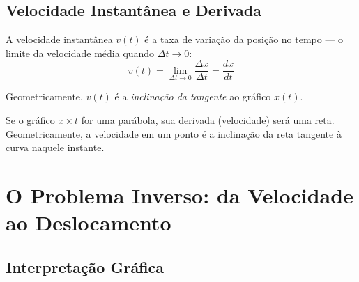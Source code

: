 \documentclass[10.5pt, a4paper]{extarticle}
\begin{document}
\subsection{Velocidade Instantânea e Derivada}

\begin{definicaobox}
A velocidade instantânea $v(t)$ é a taxa de variação da posição no tempo — o limite da velocidade média quando $\Delta t \to 0$:
\[
  v(t) = \lim_{\Delta t \to 0} \frac{\Delta x}{\Delta t} = \frac{dx}{dt}
\]
\end{definicaobox}

Geometricamente, $v(t)$ é a \textit{inclinação da tangente} ao gráfico $x(t)$.

\begin{squirtlebox}
Se o gráfico $x \times t$ for uma parábola, sua derivada (velocidade) será uma reta. Geometricamente, a velocidade em um ponto é a inclinação da reta tangente à curva naquele instante.
\end{squirtlebox}

\begin{center}
\end{center}

\section{O Problema Inverso: da Velocidade ao Deslocamento}

\subsection{Interpretação Gráfica}
\end{document}
